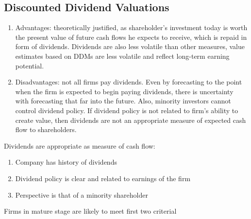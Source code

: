 \subsection{Discounted Dividend Valuations}

\begin{definition} 
\begin{enumerate}[label=\roman*.]
\setlength{\itemsep}{0pt}
\item Advantages: theoretically justified, as shareholder's investment today is worth the present value of future cash flows he expects to receive, which is repaid in form of dividends. Dividends are also less volatile than other measures, value estimates based on DDMs are less volatile and reflect long-term earning potential.
\item Disadvantages: not all firms pay dividends. Even by forecasting to the point when the firm is expected to begin paying dividends, there is uncertainty with forecasting that far into the future. Also, minority investors cannot control dividend policy. If dividend policy is not related to firm's ability to create value, then dividends are not an appropriate measure of expected cash flow to shareholders.
\end{enumerate}
Dividends are appropriate as measure of cash flow:
\begin{enumerate}[label=\roman*.]
\setlength{\itemsep}{0pt}
\item Company has history of dividends
\item Dividend policy is clear and related to earnings of the firm
\item Perspective is that of a minority shareholder
\end{enumerate}
Firms in mature stage are likely to meet first two criterial
\end{definition}

